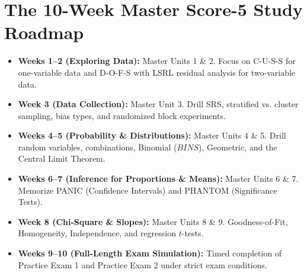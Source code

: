 \section*{The 10-Week Master Score-5 Study Roadmap}
\begin{itemize}[leftmargin=1.2em]
  \item \textbf{Weeks 1--2 (Exploring Data):} Master Units 1 \& 2. Focus on C-U-S-S for one-variable data and D-O-F-S with LSRL residual analysis for two-variable data.
  \item \textbf{Week 3 (Data Collection):} Master Unit 3. Drill SRS, stratified vs. cluster sampling, bias types, and randomized block experiments.
  \item \textbf{Weeks 4--5 (Probability \& Distributions):} Master Units 4 \& 5. Drill random variables, combinations, Binomial ($BINS$), Geometric, and the Central Limit Theorem.
  \item \textbf{Weeks 6--7 (Inference for Proportions \& Means):} Master Units 6 \& 7. Memorize PANIC (Confidence Intervals) and PHANTOM (Significance Tests).
  \item \textbf{Week 8 (Chi-Square \& Slopes):} Master Units 8 \& 9. Goodness-of-Fit, Homogeneity, Independence, and regression $t$-tests.
  \item \textbf{Weeks 9--10 (Full-Length Exam Simulation):} Timed completion of Practice Exam 1 and Practice Exam 2 under strict exam conditions.
\end{itemize}
\clearpage
